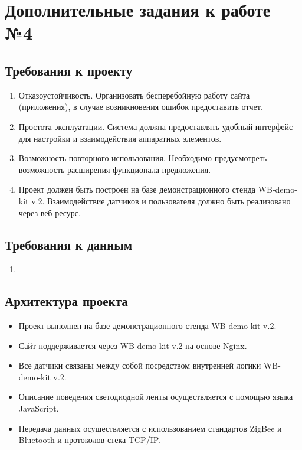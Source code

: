 \documentclass[a4paper,14pt]{extarticle}
\begin{document}
\newpage
\section{Дополнительные задания к работе №4}
\subsection{Требования к проекту}
\begin{enumerate}
	\item Отказоустойчивость. Организовать бесперебойную работу сайта (приложения), в случае возникновения ошибок предоставить отчет.
	
	\item Простота эксплуатации. Система должна предоставлять удобный интерфейс для настройки и взаимодействия аппаратных элементов.
	
	\item Возможность повторного использования. Необходимо предусмотреть возможность расширения функционала предложения.
	
	\item Проект должен быть построен на базе демонстрационного стенда WB-demo-kit v.2. Взаимодействие датчиков и пользователя должно быть реализовано через веб-ресурс.
\end{enumerate}
\subsection{Требования к данным}
\begin{enumerate}
	\item 
\end{enumerate}
\subsection{Архитектура проекта}
\begin{itemize}
	\item Проект выполнен на базе демонстрационного стенда WB-demo-kit v.2.
	
	\item Сайт поддерживается через WB-demo-kit v.2 на основе Nginx.
	
	\item Все датчики связаны между собой посредством внутренней логики WB-demo-kit v.2.
	
	\item Описание поведения светодиодной ленты осуществляется с помощью языка JavaScript.
	\item Передача данных осуществляется с использованием стандартов ZigBee и Bluetooth и протоколов стека TCP/IP. 
	
\end{itemize}
\end{document}
